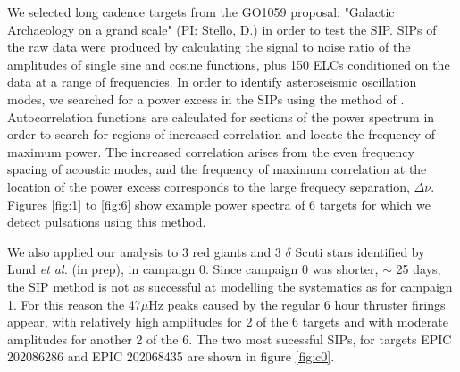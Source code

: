 \documentclass[useAMS, usenatbib]{aastex}
\begin{document}
We selected long cadence targets from the GO1059 proposal: "Galactic
Archaeology on a grand scale" (PI: Stello, D.) in order to test the SIP.
SIPs of the raw data were produced by calculating the signal to noise
ratio of the amplitudes of single sine and cosine functions, plus 150 ELCs
conditioned on the data at a range of frequencies.
In order to identify asteroseismic oscillation modes, we searched for a power
excess in the SIPs using the method of \citet{Huber2009}.
Autocorrelation functions are calculated for sections of the power spectrum in
order to search for regions of increased correlation and locate the frequency
of maximum power.
The increased correlation arises from the even frequency spacing of acoustic
modes, and the frequency of maximum correlation at the location of the power
excess corresponds to the large frequecy separation, $\Delta\nu$.
Figures \ref{fig:1} to \ref{fig:6} show example power spectra of 6 targets for
which we detect pulsations using this method.


We also applied our analysis to 3 red giants and 3 $\delta$ Scuti stars
identified by Lund {\it et al.} (in prep), in campaign 0.
Since campaign 0 was shorter, $\sim$ 25 days, the SIP method is not as
successful at modelling the systematics as for campaign 1.
For this reason the 47$\mu$Hz peaks caused by the regular 6 hour thruster
firings appear, with relatively high amplitudes for 2 of the 6 targets and with
moderate amplitudes for another 2 of the 6.
The two most sucessful SIPs, for targets EPIC 202086286 and EPIC
202068435 are shown in figure \ref{fig:c0}.
\end{document}
